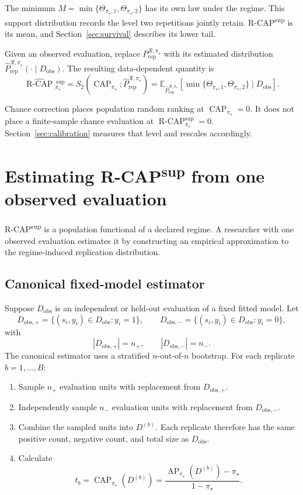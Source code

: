 \documentclass[11pt]{article}
\newcommand{\AP}{\operatorname{AP}}
\newcommand{\CAP}{\operatorname{CAP}}
\newcommand{\Regime}{\mathcal{R}}
\newcommand{\Tpi}{\CAP_{\pi_\star}}
\newcommand{\E}{\mathbb{E}}
\newcommand{\RCAP}{\operatorname{R\text{-}CAP}^{\mathrm{sup}}_{\pi_\star}}
\newcommand{\RCAPHat}{\widehat{\operatorname{R\text{-}CAP}}{}^{\,\mathrm{sup}}_{\pi_\star}}
\newcommand{\PRep}{P_{\mathrm{rep}}^{\Regime,\pi_\star}}
\newcommand{\PRepHat}{\widehat{P}_{\mathrm{rep}}^{\Regime,\pi_\star}}
\theoremstyle{remark}
\begin{document}
\begin{center}
\end{center}

The minimum $M=\min\{\Theta_{\pi_\star,1},\Theta_{\pi_\star,2}\}$ has its own law under the regime. This support distribution records the level two repetitions jointly retain. R-CAP\textsuperscript{sup} is its mean, and Section~\ref{sec:survival} describes its lower tail.

Given an observed evaluation, replace $\PRep$ with its estimated distribution $\PRepHat(\cdot\mid D_{\mathrm{obs}})$. The resulting data-dependent quantity is
\begin{equation}
\RCAPHat
=
S_2(\CAP_{\pi_\star};\PRepHat)
=
\E_{\PRepHat}
\left[
\min\{
\Theta_{\pi_\star,1},
\Theta_{\pi_\star,2}
\}
\mid D_{\mathrm{obs}}
\right].
\label{eq:rcap-estimated}
\end{equation}

Chance correction places population random ranking at $\Tpi=0$. It does not place a finite-sample chance evaluation at $\RCAP=0$. Section~\ref{sec:calibration} measures that level and rescales accordingly.

\section{Estimating R-CAP\textsuperscript{sup} from one observed evaluation}
\label{sec:estimation}

R-CAP\textsuperscript{sup} is a population functional of a declared regime. A researcher with one observed evaluation estimates it by constructing an empirical approximation to the regime-induced replication distribution.

\subsection{Canonical fixed-model estimator}

Suppose $D_{\mathrm{obs}}$ is an independent or held-out evaluation of a fixed fitted model. Let
\[
D_{\mathrm{obs},+}
=
\{(s_i,y_i)\in D_{\mathrm{obs}}:y_i=1\},
\qquad
D_{\mathrm{obs},-}
=
\{(s_i,y_i)\in D_{\mathrm{obs}}:y_i=0\},
\]
with
\[
|D_{\mathrm{obs},+}|=n_+,
\qquad
|D_{\mathrm{obs},-}|=n_-.
\]
The canonical estimator uses a stratified $n$-out-of-$n$ bootstrap. For each replicate $b=1,\ldots,B$:
\begin{enumerate}
\item Sample $n_+$ evaluation units with replacement from $D_{\mathrm{obs},+}$.
\item Independently sample $n_-$ evaluation units with replacement from $D_{\mathrm{obs},-}$.
\item Combine the sampled units into $D^{(b)}$. Each replicate therefore has the same positive count, negative count, and total size as $D_{\mathrm{obs}}$.
\item Calculate
\[
t_b=\Tpi(D^{(b)})
=
\frac{\AP_{\pi_\star}(D^{(b)})-\pi_\star}{1-\pi_\star}.
\]
\end{enumerate}
\end{document}
